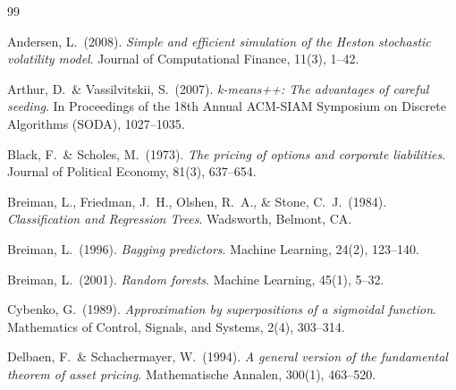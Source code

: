 \documentclass[12pt, a4paper]{report}
\theoremstyle{definition}
\begin{document}
\appendix
\appendixpage
\addappheadtotoc



\cleardoublepage
{}

\begin{thebibliography}{99}

Andersen, L.\ (2008).
\textit{Simple and efficient simulation of the Heston stochastic
  volatility model}.
Journal of Computational Finance, 11(3), 1--42.

Arthur, D.\ \& Vassilvitskii, S.\ (2007).
\textit{k-means++: The advantages of careful seeding}.
In Proceedings of the 18th Annual ACM-SIAM Symposium on Discrete
Algorithms (SODA), 1027--1035.

Black, F.\ \& Scholes, M.\ (1973).
\textit{The pricing of options and corporate liabilities}.
Journal of Political Economy, 81(3), 637--654.

Breiman, L., Friedman, J.\ H., Olshen, R.\ A., \& Stone, C.\ J.\
(1984). \textit{Classification and Regression Trees}.
Wadsworth, Belmont, CA.

Breiman, L.\ (1996).
\textit{Bagging predictors}.
Machine Learning, 24(2), 123--140.

Breiman, L.\ (2001).
\textit{Random forests}.
Machine Learning, 45(1), 5--32.

Cybenko, G.\ (1989).
\textit{Approximation by superpositions of a sigmoidal function}.
Mathematics of Control, Signals, and Systems, 2(4), 303--314.

Delbaen, F.\ \& Schachermayer, W.\ (1994).
\textit{A general version of the fundamental theorem of asset pricing}.
Mathematische Annalen, 300(1), 463--520.


\end{thebibliography}
\end{document}
